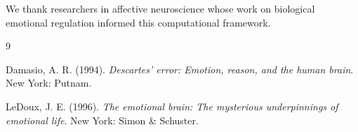 \documentclass[reprint, amsmath, amssymb, aps, prd]{revtex4-2}
\begin{document}
We thank researchers in affective neuroscience whose work on biological emotional regulation informed this computational framework.

\begin{thebibliography}{9}

 Damasio, A. R. (1994). \textit{Descartes' error: Emotion, reason, and the human brain}. New York: Putnam.

 LeDoux, J. E. (1996). \textit{The emotional brain: The mysterious underpinnings of emotional life}. New York: Simon \& Schuster.

\end{thebibliography}
\end{document}
